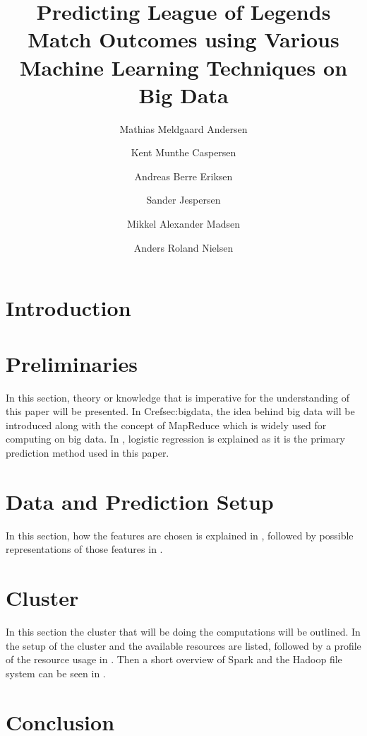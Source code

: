 \documentclass[columns=,boxcolor=white]{datart}
\title{Predicting League of Legends Match Outcomes using Various Machine Learning Techniques on Big Data}
\date{}
\author[1]{Mathias Meldgaard Andersen}
\author[1]{Kent Munthe Caspersen}
\author[1]{Andreas Berre Eriksen}
\author[1]{Sander Jespersen}
\author[1]{Mikkel Alexander Madsen}
\author[1]{Anders Roland Nielsen}
\affil[1]{Department of Computer Science, Aalborg University}
\begin{document}
\usetikzlibrary{arrows,intersections,shapes.geometric,calc}
\maketitle



\section{Introduction}\label{sec:intro}





\section{Preliminaries}\label{sec:prelim}
In this section, theory or knowledge that is imperative for the understanding of this paper will be presented. In Cref{sec:bigdata}, the idea behind big data will be introduced along with the concept of MapReduce which is widely used for computing on big data. In , logistic regression is explained as it is the primary prediction method used in this paper.




\section{Data and Prediction Setup}\label{sec:features}
In this section, how the features are chosen is explained in , followed by possible representations of those features in . 




\section{Cluster}\label{sec:cluster}
In this section the cluster that will be doing the computations will be outlined. In  the setup of the cluster and the available resources are listed, followed by a profile of the resource usage in . Then a short overview of Spark and the Hadoop file system can be seen in .







\section{Conclusion}





\newpage
\appendix



\end{document}
